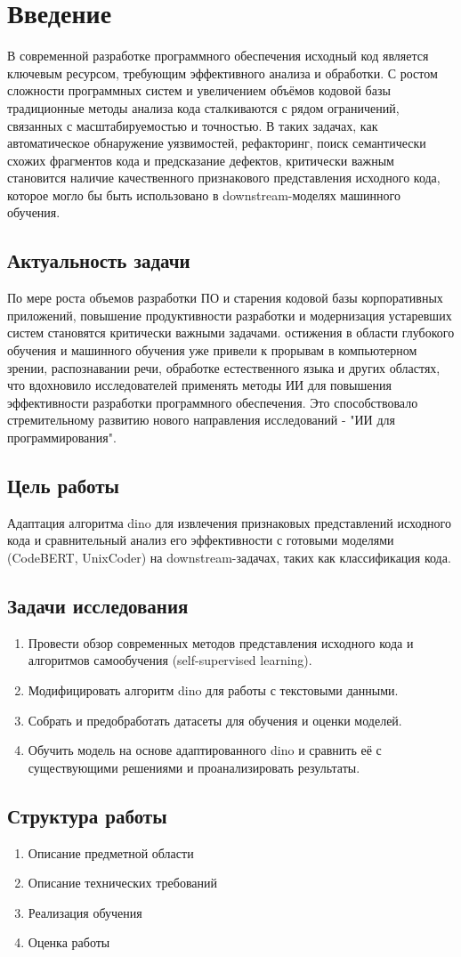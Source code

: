 \documentclass[../document.tex]{subfiles}
\begin{document}
    \section*{Введение}
    \par В современной разработке программного обеспечения исходный код является ключевым ресурсом, требующим эффективного анализа и обработки. С ростом сложности программных систем и увеличением объёмов кодовой базы традиционные методы анализа кода сталкиваются с рядом ограничений, связанных с масштабируемостью и точностью. В таких задачах, как автоматическое обнаружение уязвимостей, рефакторинг, поиск семантически схожих фрагментов кода и предсказание дефектов, критически важным становится наличие качественного признакового представления исходного кода, которое могло бы быть использовано в downstream-моделях машинного обучения.
    \subsection*{Актуальность задачи}
    \par По мере роста объемов разработки ПО и старения кодовой базы корпоративных приложений, повышение продуктивности разработки и модернизация устаревших систем становятся критически важными задачами. остижения в области глубокого обучения и машинного обучения уже привели к прорывам в компьютерном зрении, распознавании речи, обработке естественного языка и других областях, что вдохновило исследователей применять методы ИИ для повышения эффективности разработки программного обеспечения. Это способствовало стремительному развитию нового направления исследований - "ИИ для программирования". 
    \subsection*{Цель работы}
    \par Адаптация алгоритма \gls{dino} для извлечения признаковых представлений исходного кода и сравнительный анализ его эффективности с готовыми моделями (CodeBERT, UnixCoder) на downstream-задачах, таких как классификация кода.
    \subsection*{Задачи исследования}
    \begin{enumerate}
        \item Провести обзор современных методов представления исходного кода и алгоритмов самообучения (self-supervised learning).
        \item Модифицировать алгоритм \gls{dino} для работы с текстовыми данными.
        \item Собрать и предобработать датасеты для обучения и оценки моделей.
        \item Обучить модель на основе адаптированного \gls{dino} и сравнить её с существующими решениями и проанализировать результаты.
    \end{enumerate}
    \subsection*{Структура работы}
    \begin{enumerate}
        \item Описание предметной области
        \item Описание технических требований
        \item Реализация обучения
        \item Оценка работы 
    \end{enumerate}
\end{document}
